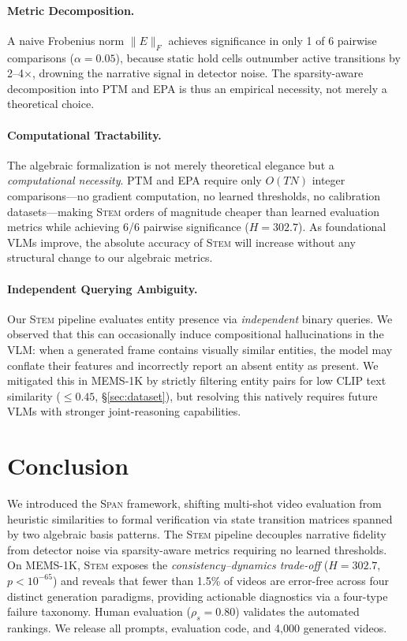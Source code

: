 \documentclass[sigconf,review,anonymous]{acmart}
\theoremstyle{definition}
\newcommand{\diagonal}{\textsc{Span}}
\newcommand{\stem}{\textsc{Stem}}
\begin{document}
\paragraph{Metric Decomposition.}
A naive Frobenius norm $\|E\|_F$ achieves significance in only 1 of 6 pairwise comparisons ($\alpha = 0.05$), because static hold cells outnumber active transitions by 2--4$\times$, drowning the narrative signal in detector noise. The sparsity-aware decomposition into PTM and EPA is thus an empirical necessity, not merely a theoretical choice.

\paragraph{Computational Tractability.}
The algebraic formalization is not merely theoretical elegance but a \emph{computational necessity}. PTM and EPA require only $O(TN)$ integer comparisons---no gradient computation, no learned thresholds, no calibration datasets---making \stem{} orders of magnitude cheaper than learned evaluation metrics while achieving 6/6 pairwise significance ($H = 302.7$). As foundational VLMs improve, the absolute accuracy of \stem{} will increase without any structural change to our algebraic metrics.

\paragraph{Independent Querying Ambiguity.}
Our \stem{} pipeline evaluates entity presence via \emph{independent} binary queries. We observed that this can occasionally induce compositional hallucinations in the VLM: when a generated frame contains visually similar entities, the model may conflate their features and incorrectly report an absent entity as present. We mitigated this in MEMS-1K by strictly filtering entity pairs for low CLIP text similarity ($\leq 0.45$, \S\ref{sec:dataset}), but resolving this natively requires future VLMs with stronger joint-reasoning capabilities.

\section{Conclusion}
\label{sec:conclusion}

We introduced the \diagonal{} framework, shifting multi-shot video evaluation from heuristic similarities to formal verification via state transition matrices spanned by two algebraic basis patterns. The \stem{} pipeline decouples narrative fidelity from detector noise via sparsity-aware metrics requiring no learned thresholds. On MEMS-1K, \stem{} exposes the \emph{consistency--dynamics trade-off} ($H = 302.7$, $p < 10^{-65}$) and reveals that fewer than 1.5\% of videos are error-free across four distinct generation paradigms, providing actionable diagnostics via a four-type failure taxonomy. Human evaluation ($\rho_s = 0.80$) validates the automated rankings. We release all prompts, evaluation code, and 4{,}000 generated videos.


\end{document}
